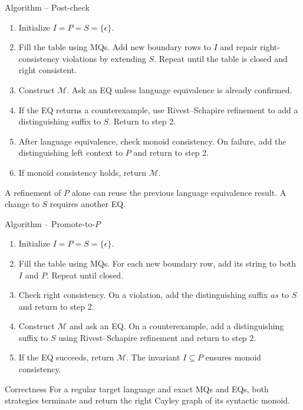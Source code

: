 \documentclass{beamer}
\begin{document}
\begin{frame}{Algorithm -- Post-check}
    \begin{enumerate}
        \item Initialize $I=P=S=\{\epsilon\}$.
        \item Fill the table using MQs. Add new boundary rows to $I$ and
        repair right-consistency violations by extending $S$.
        Repeat until the table is closed and right consistent.
        \item Construct $\mathcal{M}$. Ask an EQ unless language equivalence
        is already confirmed.
        \item If the EQ returns a counterexample, use Rivest--Schapire
        refinement to add a distinguishing suffix to $S$. Return to step 2.
        \item After language equivalence, check monoid consistency.
        On failure, add the distinguishing left context to $P$
        and return to step 2.
        \item If monoid consistency holds, return $\mathcal{M}$.
    \end{enumerate}
    \vspace{0.3em}
    {\small A refinement of $P$ alone can reuse the previous language
    equivalence result. A change to $S$ requires another EQ.}
\end{frame}

\begin{frame}{Algorithm -- Promote-to-$P$}
    \begin{enumerate}
        \item Initialize $I=P=S=\{\epsilon\}$.
        \item Fill the table using MQs. For each new boundary row,
        add its string to both $I$ and $P$. Repeat until closed.
        \item Check right consistency. On a violation, add the distinguishing
        suffix $as$ to $S$ and return to step 2.
        \item Construct $\mathcal{M}$ and ask an EQ.
        On a counterexample, add a distinguishing suffix to $S$
        using Rivest--Schapire refinement and return to step 2.
        \item If the EQ succeeds, return $\mathcal{M}$.
        The invariant $I\subseteq P$ ensures monoid consistency.
    \end{enumerate}
    \begin{alertblock}{Correctness}
        For a regular target language and exact MQs and EQs,
        both strategies terminate and return the right Cayley graph
        of its syntactic monoid.
    \end{alertblock}
\end{frame}
\end{document}
